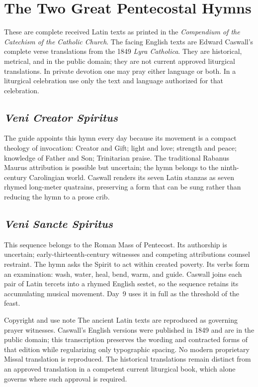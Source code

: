 \clearpage
\section{The Two Great Pentecostal Hymns}
\label{sec:hymns}

These are complete received Latin texts as printed in the \textit{Compendium of the Catechism of the Catholic Church}. The facing English texts are Edward Caswall's complete verse translations from the 1849 \textit{Lyra Catholica}. They are historical, metrical, and in the public domain; they are not current approved liturgical translations. In private devotion one may pray either language or both. In a liturgical celebration use only the text and language authorized for that celebration.

\subsection{\textit{Veni Creator Spiritus}}

The guide appoints this hymn every day because its movement is a compact theology of invocation: Creator and Gift; light and love; strength and peace; knowledge of Father and Son; Trinitarian praise. The traditional Rabanus Maurus attribution is possible but uncertain; the hymn belongs to the ninth-century Carolingian world. Caswall renders its seven Latin stanzas as seven rhymed long-meter quatrains, preserving a form that can be sung rather than reducing the hymn to a prose crib.



\subsection{\textit{Veni Sancte Spiritus}}

This sequence belongs to the Roman Mass of Pentecost. Its authorship is uncertain; early-thirteenth-century witnesses and competing attributions counsel restraint. The hymn asks the Spirit to act within created poverty. Its verbs form an examination: wash, water, heal, bend, warm, and guide. Caswall joins each pair of Latin tercets into a rhymed English sestet, so the sequence retains its accumulating musical movement. Day~9 uses it in full as the threshold of the feast.



\begin{studybox}{Copyright and use note}
The ancient Latin texts are reproduced as governing prayer witnesses. Caswall's English versions were published in 1849 and are in the public domain; this transcription preserves the wording and contracted forms of that edition while regularizing only typographic spacing. No modern proprietary Missal translation is reproduced. The historical translations remain distinct from an approved translation in a competent current liturgical book, which alone governs where such approval is required.
\end{studybox}
